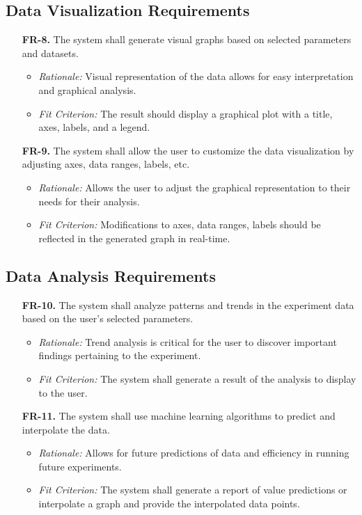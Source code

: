 \documentclass[12pt]{article}
\begin{document}
\subsection{Data Visualization Requirements}
\begin{enumerate}
  \item[\textbf{FR-8.}] The system shall generate visual graphs based on
  selected parameters and datasets.
  \begin{itemize}
    \item \textit{Rationale:} Visual representation of the data allows for easy
    interpretation and graphical analysis.
    \item \textit{Fit Criterion:} The result should display a graphical plot
    with a title, axes, labels, and a legend.
  \end{itemize}
  \item[\textbf{FR-9.}] The system shall allow the user to customize the data
  visualization by adjusting axes, data ranges, labels, etc.
  \begin{itemize}
    \item \textit{Rationale:} Allows the user to adjust the graphical
    representation to their needs for their analysis.
    \item \textit{Fit Criterion:} Modifications to axes, data ranges, labels
    should be reflected in the generated graph in real-time.
  \end{itemize}
\end{enumerate}

\subsection{Data Analysis Requirements}
\begin{enumerate}
    \item[\textbf{FR-10.}] The system shall analyze patterns and trends in the
    experiment data based on the user’s selected parameters.
    \begin{itemize}
      \item \textit{Rationale:} Trend analysis is critical for the user to
      discover important findings pertaining to the experiment.
      \item \textit{Fit Criterion:} The system shall generate a result of the
      analysis to display to the user.
    \end{itemize}
    \item[\textbf{FR-11.}] The system shall use machine learning algorithms to
    predict and interpolate the data.
    \begin{itemize}
      \item \textit{Rationale:} Allows for future predictions of data and
      efficiency in running future experiments.
      \item \textit{Fit Criterion:} The system shall generate a report of value
      predictions or interpolate a graph and provide the interpolated data
      points.
    \end{itemize}
\end{enumerate}
\end{document}
